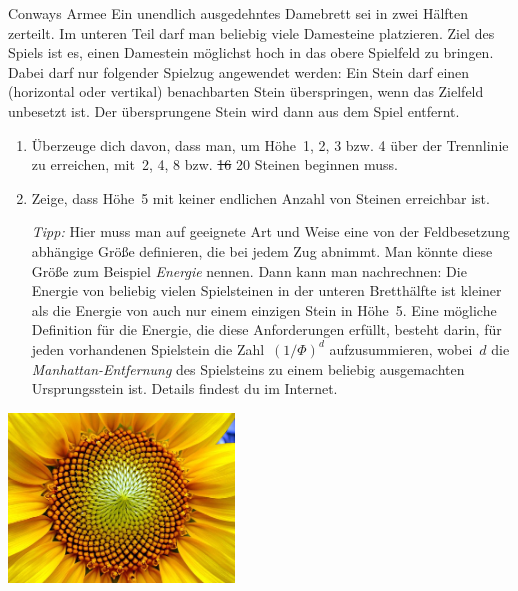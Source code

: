 \documentclass[a4paper,ngerman,twoside]{scrartcl}
\newlength{\aufgabenskip}
\newcounter{aufgabennummer}
\newenvironment{aufgabe*}[1]{
  \addtocounter{aufgabennummer}{1}
  \textbf{Aufgabe* \theaufgabennummer.} \emph{#1} \par
}{\vspace{\aufgabenskip}}
\begin{document}
\begin{aufgabe*}{Conways Armee}
Ein unendlich ausgedehntes Damebrett sei in zwei Hälften zerteilt. Im unteren
Teil darf man beliebig viele Damesteine platzieren. Ziel des Spiels ist es,
einen Damestein möglichst hoch in das obere Spielfeld zu
bringen. Dabei darf nur folgender Spielzug angewendet werden: Ein Stein
darf einen (horizontal oder vertikal) benachbarten Stein überspringen, wenn das
Zielfeld unbesetzt ist. Der übersprungene Stein wird dann aus dem Spiel
entfernt.
\begin{enumerate}
\item Überzeuge dich davon, dass man, um Höhe~1, 2, 3 bzw. 4 über der
Trennlinie zu erreichen, mit~2, 4, 8 bzw. \sout{16} 20 Steinen beginnen muss.
\item Zeige, dass Höhe~5 mit keiner endlichen Anzahl von Steinen erreichbar
ist.

\emph{Tipp:} Hier muss man auf geeignete Art und Weise eine von der
Feldbesetzung abhängige Größe definieren, die bei jedem Zug abnimmt. Man könnte
diese Größe zum Beispiel \emph{Energie} nennen. Dann kann man nachrechnen: Die
Energie von beliebig vielen Spielsteinen in der unteren Bretthälfte ist kleiner
als die Energie von auch nur einem einzigen Stein in Höhe~5. Eine mögliche
Definition für die Energie, die diese Anforderungen erfüllt, besteht darin, für
jeden vorhandenen Spielstein die Zahl~$(1/\Phi)^d$ aufzusummieren, wobei~$d$
die \emph{Manhattan-Entfernung} des Spielsteins zu einem beliebig ausgemachten
Ursprungsstein ist. Details findest du im Internet.
\end{enumerate}
\end{aufgabe*}

\vfill
\begin{center}\includegraphics[width=0.45\textwidth]{sonnenblume}\end{center}
\end{document}
